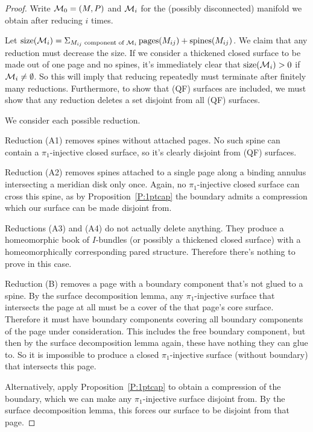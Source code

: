 \begin{proof}

Write $\mathcal{M}_0 = (M,P)$ and $\mathcal{M}_i$ for the (possibly disconnected) manifold we
obtain after reducing $i$ times.

Let $\operatorname{size}(\mathcal{M}_i) = \Sigma_{M_{ij} \text{ component of } \mathcal{M}_i}
\operatorname{pages}(M_{ij}) + \operatorname{spines}(M_{ij})$. We claim that
any reduction must decrease the size. If we consider a thickened closed surface
to be made out of one page and no spines, it's immediately clear that
$\operatorname{size}(\mathcal{M}_i)>0$ if $\mathcal{M}_i \neq \emptyset$.  So this will imply
that reducing repeatedly must terminate after finitely many reductions.
Furthermore, to show that (QF) surfaces are included, we must show that any
reduction deletes a set disjoint from all (QF) surfaces.

We consider each possible reduction.

Reduction (A1) removes spines without attached pages. No such spine can contain
a $\pi_1$-injective closed surface, so it's clearly disjoint from (QF)
surfaces.

Reduction (A2) removes spines attached to a single page along a binding annulus
intersecting a meridian disk only once. Again, no $\pi_1$-injective closed
surface can cross this spine, as by Proposition~\ref{P:1ptcap} the boundary
admits a compression which our surface can be made disjoint from.

Reductions (A3) and (A4) do not actually delete anything. They produce
a homeomorphic book of $I$-bundles (or possibly a thickened closed surface)
with a homeomorphically corresponding pared structure. Therefore there's
nothing to prove in this case.

Reduction (B) removes a page with a boundary component that's not glued to
a spine. By the surface decomposition lemma, any $\pi_1$-injective surface that
intersects the page at all must be a cover of the that page's core surface.
Therefore it must have boundary components covering all boundary components of
the page under consideration. This includes the free boundary component, but
then by the surface decomposition lemma again, these have nothing they can glue
to. So it is impossible to produce a closed $\pi_1$-injective surface (without
boundary) that intersects this page.

Alternatively, apply Proposition~\ref{P:1ptcap} to obtain a compression of the
boundary, which we can make any $\pi_1$-injective surface disjoint from. By the
surface decomposition lemma, this forces our surface to be disjoint from that
page.


\end{proof}
